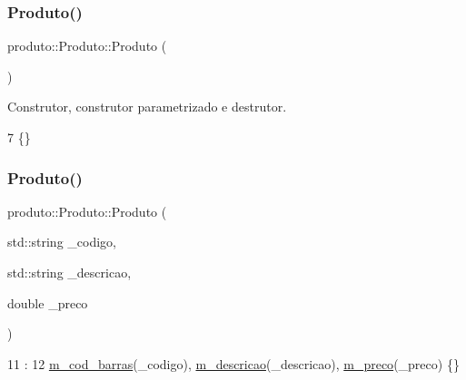 \subsubsection{\texorpdfstring{Produto()}{Produto()}\hspace{0.1cm}{\footnotesize\ttfamily [1/2]}}
{\footnotesize\ttfamily produto\+::\+Produto\+::\+Produto (\begin{DoxyParamCaption}{ }\end{DoxyParamCaption})}



Construtor, construtor parametrizado e destrutor. 


\begin{DoxyCode}
7 \{\}
\end{DoxyCode}
\mbox{\label{classproduto_1_1Produto_a8e9da9e547e4bb92539dd4687451cf09}} 
\subsubsection{\texorpdfstring{Produto()}{Produto()}\hspace{0.1cm}{\footnotesize\ttfamily [2/2]}}
{\footnotesize\ttfamily produto\+::\+Produto\+::\+Produto (\begin{DoxyParamCaption}\item[{std\+::string}]{\+\_\+codigo,  }\item[{std\+::string}]{\+\_\+descricao,  }\item[{double}]{\+\_\+preco }\end{DoxyParamCaption})}


\begin{DoxyCode}
11                                                                           :
12         \hyperlink{classproduto_1_1Produto_af441e885b23e4b6782be22c0be25ba72}{m\_cod\_barras}(\_codigo), \hyperlink{classproduto_1_1Produto_a17af898b167c20f905f3d2d16f7aeac0}{m\_descricao}(\_descricao), 
      \hyperlink{classproduto_1_1Produto_aaa3f0f133345202eafcb2fa72248e05d}{m\_preco}(\_preco) \{\}
\end{DoxyCode}
\mbox{\label{classproduto_1_1Produto_a14eeea10c0112fafaf5cb5a24ce028b8}} 
